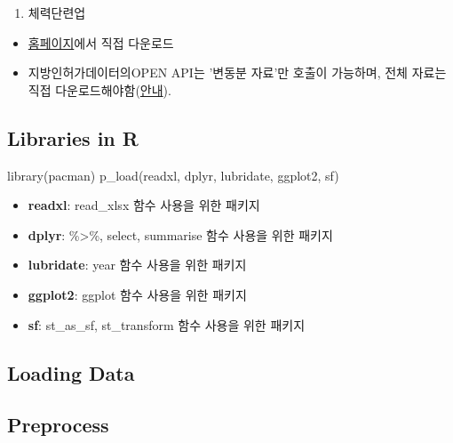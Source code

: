 \documentclass[
]{book}
\newenvironment{Shaded}{\begin{snugshade}}{\end{snugshade}}
\newcommand{\FunctionTok}[1]{\textcolor[rgb]{0.00,0.00,0.00}{#1}}
\newcommand{\NormalTok}[1]{#1}
\providecommand{\tightlist}{%
  \setlength{\itemsep}{0pt}\setlength{\parskip}{0pt}}
\begin{document}
\begin{enumerate}
\def\labelenumi{\arabic{enumi}.}
\tightlist
\item
  체력단련업
\end{enumerate}

\begin{itemize}
\item
  \href{https://www.localdata.go.kr/devcenter/dataDown.do?menuNo=20001}{홈페이지}에서 직접 다운로드
\item
  지방인허가데이터의OPEN API는 '변동분 자료'만 호출이 가능하며, 전체 자료는 직접 다운로드해야함(\href{https://www.localdata.go.kr/devcenter/apiGuide.do?menuNo=20002}{안내}).
\end{itemize}

\hypertarget{libraries-in-r}{%
\subsection{Libraries in R}\label{libraries-in-r}}

\begin{Shaded}
\begin{Highlighting}[]
\FunctionTok{library}\NormalTok{(pacman)}
\FunctionTok{p\_load}\NormalTok{(readxl, dplyr, lubridate, ggplot2, sf)}
\end{Highlighting}
\end{Shaded}

\begin{itemize}
\item
  \textbf{readxl}: read\_xlsx 함수 사용을 위한 패키지
\item
  \textbf{dplyr}: \%\textgreater\%, select, summarise 함수 사용을 위한 패키지
\item
  \textbf{lubridate}: year 함수 사용을 위한 패키지
\item
  \textbf{ggplot2}: ggplot 함수 사용을 위한 패키지
\item
  \textbf{sf}: st\_as\_sf, st\_transform 함수 사용을 위한 패키지
\end{itemize}

\hypertarget{loading-data}{%
\subsection{Loading Data}\label{loading-data}}

\hypertarget{preprocess}{%
\subsection{Preprocess}\label{preprocess}}
\end{document}
